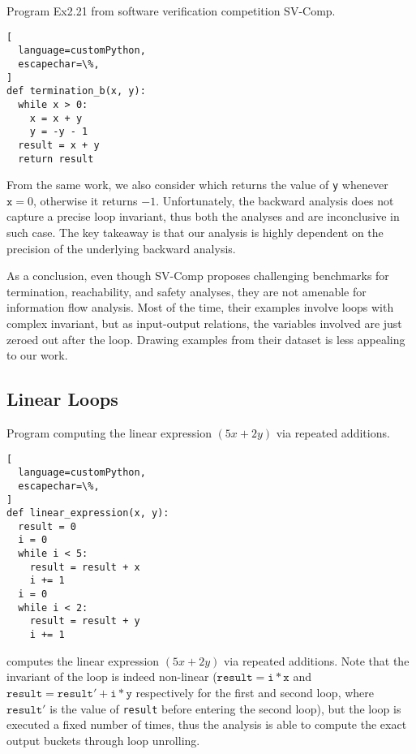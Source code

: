 \begin{marginlisting}[-1.4cm]
  \caption{Program Ex2.21 from software verification competition SV-Comp.}
  \vspace{0.5cm}
\begin{lstlisting}[
  language=customPython,
  escapechar=\%,
]
def termination_b(x, y):
  while x > 0:
    x = x + y
    y = -y - 1
  result = x + y
  return result
\end{lstlisting}
\end{marginlisting}

From the same work, we also consider  which returns the value of \texttt{y} whenever $\texttt{x} = 0$, otherwise it returns $-1$.
Unfortunately, the backward analysis does not capture a precise loop invariant, thus both the analyses \outcomesname{} and \rangename are inconclusive in such case.
The key takeaway is that our analysis is highly dependent on the precision of the underlying backward analysis.

As a conclusion, even though SV-Comp proposes challenging benchmarks for termination, reachability, and safety analyses, they are not amenable for information flow analysis.
Most of the time, their examples involve loops with complex invariant, but as input-output relations, the variables involved are just zeroed out after the loop.
Drawing examples from their dataset is less appealing to our work.

\subsection{Linear Loops}


\begin{marginlisting}
  \caption{Program computing the linear expression $(5x + 2y)$ via repeated additions.}
  \vspace{0.9cm}
\begin{lstlisting}[
  language=customPython,
  escapechar=\%,
]
def linear_expression(x, y):
  result = 0
  i = 0
  while i < 5:
    result = result + x
    i += 1
  i = 0
  while i < 2:
    result = result + y
    i += 1
\end{lstlisting}
\end{marginlisting}

 computes the linear expression $(5x + 2y)$ via repeated additions.
Note that the invariant of the loop is indeed non-linear ($\texttt{result} = \texttt{i} * \texttt{x}$ and $\texttt{result} = \texttt{result}' + \texttt{i} * \texttt{y}$ respectively for the first and second loop, where $\texttt{result}'$ is the value of \texttt{result} before entering the second loop), but the loop is executed a fixed number of times, thus the analysis is able to compute the exact output buckets through loop unrolling.

